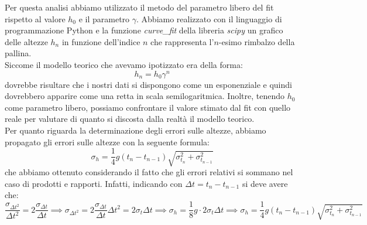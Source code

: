 \documentclass{article}
\begin{document}
Per questa analisi abbiamo utilizzato il metodo del parametro libero del fit rispetto al valore $h_0$ e il parametro $\gamma$. Abbiamo realizzato con il linguaggio di programmazione Python e la funzione \emph{curve\_fit} della libreria \emph{scipy} un grafico delle altezze $h_n$ in funzione dell'indice $n$ che rappresenta l'$n$-esimo rimbalzo della pallina. \\
Siccome il modello teorico che avevamo ipotizzato era della forma:
$$
	h_n = h_0 \gamma^n
$$
dovrebbe risultare che i nostri dati si dispongono come un esponenziale e quindi dovrebbero apparire come una retta in scala semilogaritmica. Inoltre,  tenendo $h_0$ come parametro libero, possiamo confrontare il valore stimato dal fit con quello reale per valutare di quanto si discosta dalla realtà il modello teorico. \\
Per quanto riguarda la determinazione degli errori sulle altezze, abbiamo propagato gli errori sulle altezze con la seguente formula:
$$
	\sigma_h = \frac{1}{4}g(t_n - t_{n-1})\sqrt{\sigma^2_{t_n} + \sigma^2_{t_{n-1}}}
$$
che abbiamo ottenuto considerando il fatto che gli errori relativi si sommano nel caso di prodotti e rapporti. Infatti, indicando con $\Delta t = t_n - t_{n-1}$ si deve avere che:
$$
	\frac{\sigma_{\Delta t^2}}{\Delta t^2} = 2\frac{\sigma_{\Delta t}}{\Delta t} \implies \sigma_{\Delta t^2} = 2\frac{\sigma_{\Delta t}}{\Delta t} \Delta t^{2} = 2\sigma_t \Delta t \implies \sigma_h = \frac{1}{8}g \cdot 2 \sigma_t \Delta t \implies \sigma_h = \frac{1}{4}g(t_n - t_{n-1})\sqrt{\sigma_{t_n}^2 + \sigma^2_{t_{n-1}}}
$$
\end{document}
